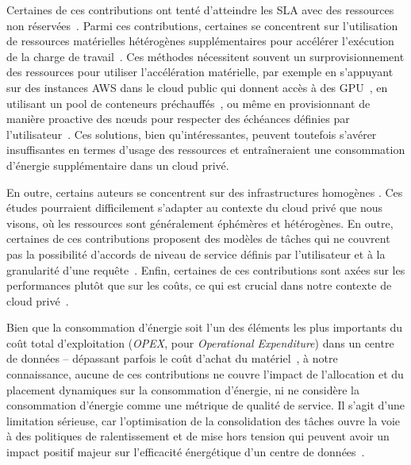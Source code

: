 Certaines de ces contributions ont tenté d'atteindre les SLA avec des ressources non réservées~\cite{gujaratiSwayamDistributedAutoscaling2017, zhangMArkExploitingCloud, mampageDeadlineawareDynamicResource2021, singhviAtollScalableLowLatency2021, handaoui2020releaser, handaoui2020salamander, yalles2022riscless}. Parmi ces contributions, certaines se concentrent sur l'utilisation de ressources matérielles hétérogènes supplémentaires pour accélérer l'exécution de la charge de travail~\cite{zhangMArkExploitingCloud, lingPigeonDynamicEfficient2019, yangINFlessNativeServerless2022}. Ces méthodes nécessitent souvent un surprovisionnement des ressources pour utiliser l'accélération matérielle, par exemple en s'appuyant sur des instances AWS dans le cloud public qui donnent accès à des GPU~\cite{zhangMArkExploitingCloud}, en utilisant un pool de conteneurs préchauffés~\cite{lingPigeonDynamicEfficient2019}, ou même en provisionnant de manière proactive des nœuds pour respecter des échéances définies par l'utilisateur~\cite{singhviAtollScalableLowLatency2021}. Ces solutions, bien qu'intéressantes, peuvent toutefois s'avérer insuffisantes en termes d'usage des ressources et entraîneraient une consommation d'énergie supplémentaire dans un cloud privé.

En outre, certains auteurs se concentrent sur des infrastructures homogènes \cite{gujaratiSwayamDistributedAutoscaling2017, sureshENSUREEfficientScheduling2020, mampageDeadlineawareDynamicResource2021, singhviAtollScalableLowLatency2021, yangINFlessNativeServerless2022}. Ces études pourraient difficilement s'adapter au contexte du cloud privé que nous visons, où les ressources sont généralement éphémères et hétérogènes. En outre, certaines de ces contributions proposent des modèles de tâches qui ne couvrent pas la possibilité d'accords de niveau de service définis par l'utilisateur et à la granularité d'une requête~\cite{sureshENSUREEfficientScheduling2020, lingPigeonDynamicEfficient2019}. Enfin, certaines de ces contributions sont axées sur les performances plutôt que sur les coûts, ce qui est crucial dans notre contexte de cloud privé~\cite{gujaratiSwayamDistributedAutoscaling2017, lingPigeonDynamicEfficient2019, singhviAtollScalableLowLatency2021, choSLADrivenMLInference}.

Bien que la consommation d'énergie soit l'un des éléments les plus importants du coût total d'exploitation (\textit{OPEX}, pour \textit{Operational Expenditure}) dans un centre de données -- dépassant parfois le coût d'achat du matériel~\cite{7279063}, à notre connaissance, aucune de ces contributions ne couvre l'impact de l'allocation et du placement dynamiques sur la consommation d'énergie, ni ne considère la consommation d'énergie comme une métrique de qualité de service. Il s'agit d'une limitation sérieuse, car l'optimisation de la consolidation des tâches ouvre la voie à des politiques de ralentissement et de mise hors tension qui peuvent avoir un impact positif majeur sur l'efficacité énergétique d'un centre de données~\cite{chaurasiaComprehensiveSurveyEnergyaware2021}.

